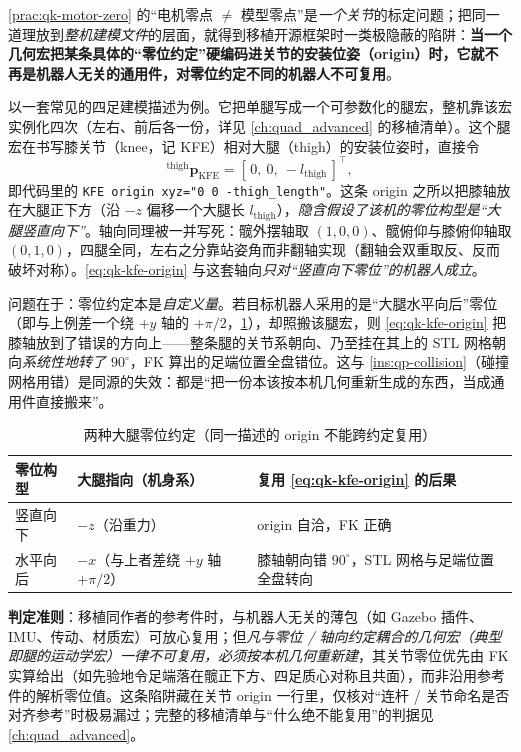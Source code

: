 \begin{insight}\label{ins:qk-geom-macro-reuse}
\cref{prac:qk-motor-zero} 的“电机零点 $\neq$ 模型零点”是\emph{一个关节}的标定问题；把同一道理放到\emph{整机建模文件}的层面，就得到移植开源框架时一类极隐蔽的陷阱：\textbf{当一个几何宏把某条具体的“零位约定”硬编码进关节的安装位姿（origin）时，它就不再是机器人无关的通用件，对零位约定不同的机器人不可复用}。

以一套常见的四足建模描述为例。它把单腿写成一个可参数化的腿宏，整机靠该宏实例化四次（左右、前后各一份，详见 \cref{ch:quad_advanced} 的移植清单）。这个腿宏在书写膝关节（knee，记 KFE）相对大腿（thigh）的安装位姿时，直接令
\begin{equation}
  {}^{\text{thigh}}\boldsymbol{p}_{\text{KFE}}=[\,0,\ 0,\ -l_{\text{thigh}}\,]^\top,
  \label{eq:qk-kfe-origin}
\end{equation}
即代码里的 \texttt{KFE origin xyz="0 0 -thigh\_length"}。这条 origin 之所以把膝轴放在大腿正下方（沿 $-z$ 偏移一个大腿长 $l_{\text{thigh}}$），\emph{隐含假设了该机的零位构型是“大腿竖直向下”}。轴向同理被一并写死：髋外摆轴取 $(1,0,0)$、髋俯仰与膝俯仰轴取 $(0,1,0)$，四腿全同，左右之分靠站姿角而非翻轴实现（翻轴会双重取反、反而破坏对称）。\cref{eq:qk-kfe-origin} 与这套轴向\emph{只对“竖直向下零位”的机器人成立}。

问题在于：零位约定本是\emph{自定义量}。若目标机器人采用的是“大腿水平向后”零位（即与上例差一个绕 $+y$ 轴的 $+\pi/2$，\cref{tab:qk-zero-conv}），却照搬该腿宏，则 \cref{eq:qk-kfe-origin} 把膝轴放到了错误的方向上——整条腿的关节系朝向、乃至挂在其上的 STL 网格朝向\emph{系统性地转了 $90^\circ$}，FK 算出的足端位置全盘错位。这与 \cref{ins:qp-collision}（碰撞网格用错）是同源的失效：都是“把一份本该按本机几何重新生成的东西，当成通用件直接搬来”。

\begin{table}[H]\centering\small
\caption{两种大腿零位约定（同一描述的 origin 不能跨约定复用）}
\label{tab:qk-zero-conv}
\begin{tabular}{p{} p{} p{}}
\toprule
零位构型 & 大腿指向（机身系） & 复用 \cref{eq:qk-kfe-origin} 的后果 \\
\midrule
竖直向下 & $-z$（沿重力） & origin 自洽，FK 正确 \\
水平向后 & $-x$（与上者差绕 $+y$ 轴 $+\pi/2$） & 膝轴朝向错 $90^\circ$，STL 网格与足端位置全盘转向 \\
\bottomrule
\end{tabular}
\end{table}

\textbf{判定准则}：移植同作者的参考件时，与机器人无关的薄包（如 Gazebo 插件、IMU、传动、材质宏）可放心复用；但\emph{凡与零位 / 轴向约定耦合的几何宏（典型即腿的运动学宏）一律不可复用，必须按本机几何重新建}，其关节零位优先由 FK 实算给出（如先验地令足端落在髋正下方、四足质心对称且共面），而非沿用参考件的解析零位值。这条陷阱藏在关节 origin 一行里，仅核对“连杆 / 关节命名是否对齐参考”时极易漏过；完整的移植清单与“什么绝不能复用”的判据见 \cref{ch:quad_advanced}。
\end{insight}

